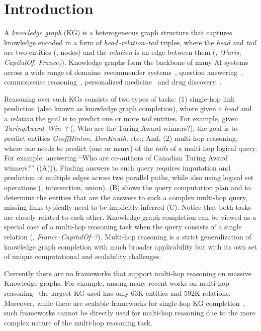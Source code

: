 
\section{Introduction}
A \emph{knowledge graph} (KG) is a heterogeneous graph structure that captures knowledge encoded in a form of {\em head--relation--tail} triples, where the {\em head} and {\em tail} are two entities (\ie, nodes) and the {\em relation} is an edge between them (\eg, {\em (Paris, CapitalOf, France)}).
Knowledge graphs form the backbone of many AI systems across a wide range of domains: recommender systems~\citep{wang2018dkn,ying2018graph,wang2019knowledge,wu2019dual}, question answering~\citep{berant2013semantic,sun2018open,sun2019pullnet,saxena2020improving,ren2021lego},  commonsense reasoning~\citep{lin2019kagnet,feng2020scalable,yasunaga2021qa,lv2020graph}, personalized medicine~\cite{ruiz2021identification} and drug discovery~\cite{zitnik2018modeling,drkg2020}.

Reasoning over such KGs consists of two types of tasks: (1) single-hop link prediction (also known as knowledge graph completion), where given a {\em head} and a {\em relation} the goal is to predict one or more {\em tail} entities. For example, given {\em TuringAward--Win--?} (\ie, Who are the Turing Award winners?), the goal is to predict entities {\em GeoffHinton, DonKnuth}, etc.; %
And, (2) multi-hop reasoning, where one needs to predict (one or many) of the {\em tails} of a multi-hop logical query. For example, answering ``Who are co-authors of Canadian Turing Award winners?'' ((A))).
Finding answers to such query requires imputation and prediction of multiple edges across two parallel paths, while also using logical set operations (\eg, intersection, union). (B) shows the query computation plan and to determine the entities that are the answers to such a complex multi-hop query, missing links typically need to be implicitly inferred (C).
%
Notice that both tasks are closely related to each other. Knowledge graph completion can be viewed as a special case of a multi-hop reasoning task when the query consists of a single relation (\eg, {\em France--CapitalOf--?}). Multi-hop reasoning is a strict generalization of knowledge graph completion with much broader applicability but with its own set of unique computational and scalability challenges. 

Currently there are no frameworks that support multi-hop reasoning on massive Knowledge graphs. For example, among many recent works on multi-hop reasoning~\citep{hamilton2018embedding,ren2020query2box,ren2020beta,sun2020faithful,guu2015traversing,das2017chains,chen2021fuzzy,liu2021neural,kotnis2020answering,zhang2021cone,choudhary2021probabilistic} the largest KG used has only 63K entities and 592K relations.
%
Moreover, while there are scalable frameworks for single-hop KG completion~\citep{zhu2019graphvite,lerer2019pytorch,zheng2020dgl,pgl,mohoney2021marius}, such frameworks cannot be directly used for multi-hop reasoning due to the more complex nature of the multi-hop reasoning task.


